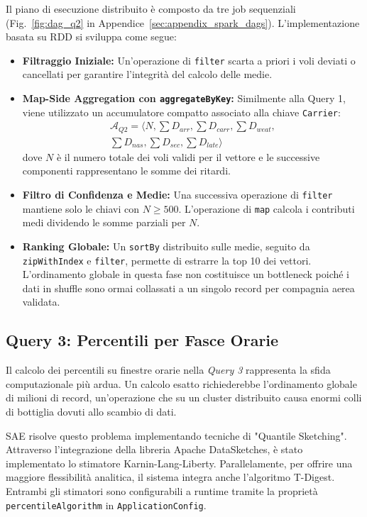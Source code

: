 \documentclass[conference]{IEEEtran}
\begin{document}
Il piano di esecuzione distribuito è composto da tre job sequenziali (Fig.~\ref{fig:dag_q2} in Appendice~\ref{sec:appendix_spark_dags}).
L'implementazione basata su RDD si sviluppa come segue:
\begin{itemize}
    \item \textbf{Filtraggio Iniziale:} Un'operazione di \texttt{filter} scarta a priori i voli deviati o cancellati per garantire l'integrità del calcolo delle medie.
    \item \textbf{Map-Side Aggregation con \texttt{aggregateByKey}:} Similmente alla Query 1, viene utilizzato un accumulatore compatto associato alla chiave \texttt{Carrier}:
    \[
    \begin{aligned}
    \mathcal{A}_{Q2} = \langle N, \textstyle \sum D_{arr}, \textstyle \sum D_{carr}, \textstyle \sum D_{weat}, \\
    \textstyle \sum D_{nas}, \textstyle \sum D_{sec}, \textstyle \sum D_{late} \rangle
    \end{aligned}
    \]
    dove $N$ è il numero totale dei voli validi per il vettore e le successive componenti rappresentano le somme dei ritardi.
    \item \textbf{Filtro di Confidenza e Medie:} Una successiva operazione di \texttt{filter} mantiene solo le chiavi con $N \ge 500$. L'operazione di \texttt{map} calcola i contributi medi dividendo le somme parziali per $N$.
    \item \textbf{Ranking Globale:} Un \texttt{sortBy} distribuito sulle medie, seguito da \texttt{zipWithIndex} e \texttt{filter}, permette di estrarre la top 10 dei vettori. L'ordinamento globale in questa fase non costituisce un bottleneck poiché i dati in shuffle sono ormai collassati a un singolo record per compagnia aerea validata.
\end{itemize}

\subsection{Query 3: Percentili per Fasce Orarie}
Il calcolo dei percentili su finestre orarie nella \textit{Query 3} rappresenta la sfida computazionale più ardua.
Un calcolo esatto richiederebbe l'ordinamento globale di milioni di record, un'operazione che su un cluster distribuito causa enormi colli di bottiglia dovuti allo scambio di dati.

SAE risolve questo problema implementando tecniche di "Quantile Sketching".
Attraverso l'integrazione della libreria Apache DataSketches, è stato implementato lo stimatore Karnin-Lang-Liberty.
Parallelamente, per offrire una maggiore flessibilità analitica, il sistema integra anche l'algoritmo T-Digest.
Entrambi gli stimatori sono configurabili a runtime tramite la proprietà \texttt{percentileAlgorithm} in \texttt{ApplicationConfig}.
\end{document}
